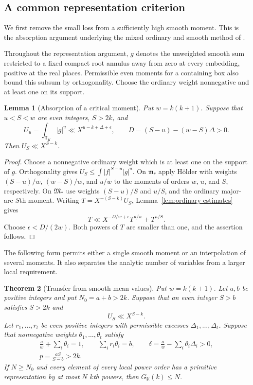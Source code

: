 \documentclass[11pt]{amsart}
\newtheorem{theorem}{Theorem}[section]
\newtheorem{lemma}[theorem]{Lemma}
\theoremstyle{definition}
\numberwithin{equation}{section}
\begin{document}
\subsection{A common representation criterion}
\label{sec:product-endgame}

We first remove the small loss from a sufficiently high smooth moment.
This is the absorption argument underlying the mixed ordinary and
smooth method of \cite{Wooley2016}.

Throughout the representation argument, $g$ denotes the unweighted
smooth sum restricted to a fixed compact root annulus away from zero
at every embedding, positive at the real places. Permissible even
moments for a containing box also bound this subsum by orthogonality.
Choose the ordinary weight nonnegative and at least one on its support.

\begin{lemma}[Absorption of a critical moment]
\label{prop:bootstrap-here}
Put $w=k(k+1)$. Suppose that $u<S<w$ are even integers, $S>2k$, and
\[
 U_u=\int_{\mathbb T_K}|g|^u\ll X^{u-k+\Delta+\epsilon},
 \qquad D=(S-u)-(w-S)\Delta>0.
\]
Then $U_S\ll X^{S-k}$.
\end{lemma}
\begin{proof}
Choose a nonnegative ordinary weight which is at least one on the
support of $g$. Orthogonality gives
$U_S\le\int |f|^{S-u}|g|^u$.
On $\mathfrak m_*$ apply H\"older with weights
$(S-u)/w$, $(w-S)/w$, and $u/w$ to the moments of orders
$w$, $u$, and $S$, respectively. On $\mathfrak M_*$ use weights
$(S-u)/S$ and $u/S$, and the ordinary major-arc $S$th moment.
Writing $T=X^{-(S-k)}U_S$, Lemma~\ref{lem:ordinary-estimates} gives
\[
 T\ll X^{-D/w+\epsilon}T^{u/w}+T^{u/S}.
\]
Choose $\epsilon<D/(2w)$. Both powers of $T$ are smaller than one,
and the assertion follows.
\end{proof}

The following form permits either a single smooth moment or an
interpolation of several moments. It also separates the analytic
number of variables from a larger local requirement.

\begin{theorem}[Transfer from smooth mean values]
\label{thm:general-transfer}
Put $w=k(k+1)$. Let $a,b$ be positive integers and put $N_0=a+b>2k$.
Suppose that an even integer $S>b$ satisfies $S>2k$ and
\[
 U_S\ll X^{S-k}.
\]
Let $r_1,\ldots,r_t$ be even positive integers with permissible
excesses $\Delta_1,\ldots,\Delta_t$. Suppose that nonnegative
weights $\theta_1,\ldots,\theta_t$ satisfy
\begin{gather}
 \frac a{w}+\sum_i\theta_i=1,\qquad
 \sum_i r_i\theta_i=b,\qquad
 \delta=\frac a{w}-\sum_i\theta_i\Delta_i>0,
 \label{eq:general-minor-criterion}\\
 p=\frac{aS}{S-b}>2k.\label{eq:general-annulus-criterion}
\end{gather}
If $N\ge N_0$ and every element of every local power order has a
primitive representation by at most $N$ $k$th powers, then
$G_{\mathbb K}(k)\le N$.
\end{theorem}
\end{document}
